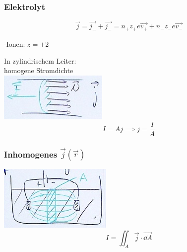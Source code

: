 \subsubsection{Elektrolyt}
\[ \vec{j} = \vec{j_{+}} + \vec{j_{-}} = n_{+} z_{+} e \vec{v_{+}} + n_{-} z_{-} e \vec{v_{-}} \]
\begin{bsp*}[ head = z.B. ]
	-Ionen: $z = +2$
\end{bsp*}

In zylindrischem Leiter: \\
homogene Stromdichte \\
\includegraphics{Bild176}
\[ I = A j \implies j = \frac{I}{A} \]

\subsubsection{Inhomogenes \texorpdfstring{$\vec{j}(\vec{r})$}{j(r)}}
\begin{bsp*}[ note = Elektrolyt ]
	\includegraphics{Bild177}
	\[ I = \iint_A \vec{j} \cdot \vec{\dd A} \]
\end{bsp*}

